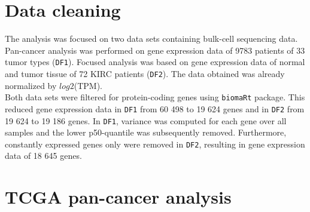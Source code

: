 \documentclass[
  parskip,
  oneside]{scrreprt}
\begin{document}
\hypertarget{data-cleaning}{%
\section{Data cleaning}\label{data-cleaning}}

The analysis was focused on two data sets containing bulk-cell
sequencing data. Pan-cancer analysis was performed on gene expression
data of 9783 patients of 33 tumor types (\texttt{DF1}). Focused analysis
was based on gene expression data of normal and tumor tissue of 72 KIRC
patients (\texttt{DF2}). The data obtained was already normalized by
\(log2\)(TPM).\\
Both data sets were filtered for protein-coding genes using
\texttt{biomaRt} package. This reduced gene expression data in
\texttt{DF1} from 60 498 to 19 624 genes and in \texttt{DF2} from 19 624
to 19 186 genes. In \texttt{DF1}, variance was computed for each gene
over all samples and the lower p50-quantile was subsequently removed.
Furthermore, constantly expressed genes only were removed in
\texttt{DF2}, resulting in gene expression data of 18 645 genes.

\hypertarget{tcga-pan-cancer-analysis}{%
\section{TCGA pan-cancer analysis}\label{tcga-pan-cancer-analysis}}
\end{document}
